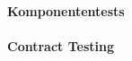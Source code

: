 \documentclass[12pt,a4paper,bibliography=totocnumbered,listof=totocnumbered]{scrartcl}
\begin{document}
\paragraph{Komponententests}

\paragraph{Contract Testing}

\end{document}
